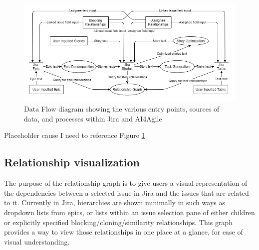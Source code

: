 \begin{figure}
\centerline{\includegraphics[width=\textwidth,height=\textheight,keepaspectratio]{./figure/DataflowDiagram.png}}
\caption{Data Flow diagram showing the various entry points, sources of data, and processes within Jira and AI4Agile}
\label{fig:DataFlowDiagram}
\end{figure}
Placeholder cause I need to reference Figure \ref{fig:DataFlowDiagram}
\subsection{Relationship visualization}
The purpose of the relationship graph is to give users a visual representation of the dependencies between a selected issue in Jira and the issues that are related to it. Currently in Jira, hierarchies are shown minimally in such ways as dropdown lists from epics, or lists within an issue selection pane of either children or explicitly specified blocking/cloning/similarity relationships. This graph provides a way to view those relationships in one place at a glance, for ease of visual understanding.
